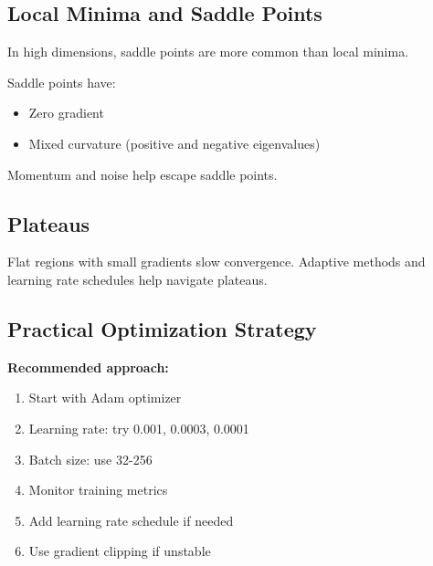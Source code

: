 \subsection{Local Minima and Saddle Points}

In high dimensions, saddle points are more common than local minima.

Saddle points have:
\begin{itemize}
    \item Zero gradient
    \item Mixed curvature (positive and negative eigenvalues)
\end{itemize}

Momentum and noise help escape saddle points.

\subsection{Plateaus}

Flat regions with small gradients slow convergence. Adaptive methods and learning rate schedules help navigate plateaus.

\subsection{Practical Optimization Strategy}

\textbf{Recommended approach:}
\begin{enumerate}
    \item Start with Adam optimizer
    \item Learning rate: try 0.001, 0.0003, 0.0001
    \item Batch size: use 32-256
    \item Monitor training metrics
    \item Add learning rate schedule if needed
    \item Use gradient clipping if unstable
\end{enumerate}

